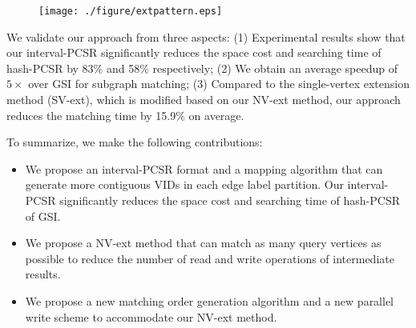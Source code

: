 \begin{figure}
\centering
\texttt{[image: ./figure/extpattern.eps]}
\caption{}	
\label{fig:extpattern}
\end{figure}

 We validate our approach from three aspects: (1) Experimental results show that our interval-PCSR significantly reduces the space cost and searching time of hash-PCSR by 83\% and 58\% respectively; (2) We obtain an average speedup of $5\times$ over GSI for subgraph matching; (3) Compared to the single-vertex extension method (SV-ext), which is modified based on our NV-ext method, our approach reduces the matching time by 15.9\% on average.

 To summarize, we make the following contributions:
 \begin{itemize}
  \item We propose an interval-PCSR format and a mapping algorithm that can generate more contiguous VIDs in each edge label partition. Our interval-PCSR significantly reduces the space cost and searching time of hash-PCSR of GSI.
  \item We propose a NV-ext method that can match as many query vertices as possible to reduce the number of read and write operations of intermediate results.
  \item We propose a new matching order generation algorithm and a new parallel write scheme to accommodate our NV-ext method.
\end{itemize}
